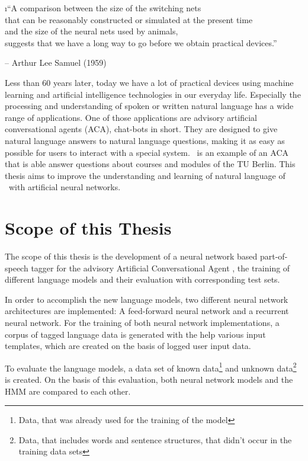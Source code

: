 \i{``A comparison between the size of the switching nets\\that can be reasonably constructed or simulated at the present time\\and the size of the neural nets used by animals,\\suggests that we have a long way to go before we obtain practical devices.''}\\
\parbox{\textwidth}{\hfill \hfill -- Arthur Lee Samuel (1959)}

Less than 60 years later, today we have a lot of practical devices using machine learning and artificial intelligence technologies in our everyday life. Especially the processing and understanding of spoken or written natural language has a wide range of applications. One of those applications are advisory artificial conversational agents (ACA), chat-bots in short. They are designed to give natural language answers to natural language questions, making it as easy as possible for users to interact with a special system. \Alex\ is an example of an ACA that is able answer questions about courses and modules of the TU Berlin. This thesis aims to improve the understanding and learning of natural language of \Alex\ with artificial neural networks.

\section{Scope of this Thesis}\label{c.introduction.scope}
The scope of this thesis is the development of a neural network based part-of-speech tagger for the advisory Artificial Conversational Agent \Alex, the training of different language models and their evaluation with corresponding test sets.

In order to accomplish the new language models, two different neural network architectures are implemented: A feed-forward neural network and a recurrent neural network. For the training of both neural network implementations, a corpus of tagged language data is generated with the help various input templates, which are created on the basis of logged user input data.

To evaluate the language models, a data set of known data\footnote{Data, that was already used for the training of the model} and unknown data\footnote{Data, that includes words and sentence structures, that didn't occur in the training data sets} is created. On the basis of this evaluation, both neural network models and the HMM are compared to each other.

